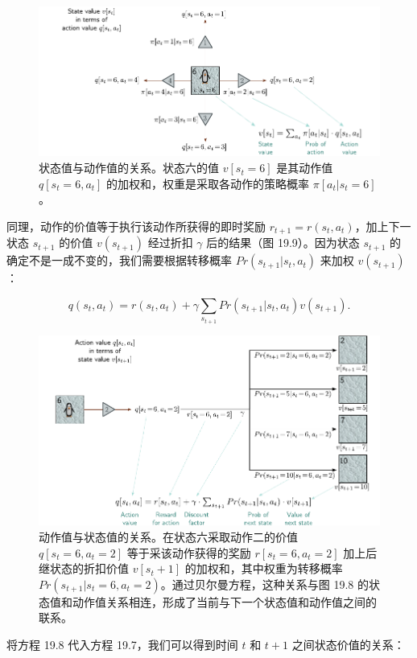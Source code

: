 \documentclass[lang=cn,newtx,10pt,scheme=chinese]{elegantbook}
\begin{document}
\begin{figure}[ht!]
\centering
\includegraphics[width=0.7\linewidth]{PDFFigures/UDLChap19PDF/ReinforceBellman3.pdf}
\caption{状态值与动作值的关系。状态六的值 \(v[s_t =6]\) 是其动作值 \(q[s_t =6,a_t]\) 的加权和，权重是采取各动作的策略概率 \(\pi[a_t|s_t =6]\)。}
\end{figure}

同理，动作的价值等于执行该动作所获得的即时奖励 \(r_{t+1} = r(s_t, a_t)\)，加上下一状态 \(s_{t+1}\) 的价值 \(v(s_{t+1})\) 经过折扣 \(\gamma\) 后的结果（图 19.9）。因为状态 \(s_{t+1}\) 的确定不是一成不变的，我们需要根据转移概率 \(Pr(s_{t+1}|s_t, a_t)\) 来加权 \(v(s_{t+1})\)：

\begin{equation}
q(s_t, a_t) = r(s_t, a_t) + \gamma \sum_{s_{t+1}} Pr(s_{t+1}|s_t, a_t)v(s_{t+1}). 
\end{equation}

\begin{figure}[ht!]
\centering
\includegraphics[width=0.7\linewidth]{PDFFigures/UDLChap19PDF/ReinforceBellman2.pdf}
\caption{动作值与状态值的关系。在状态六采取动作二的价值 \(q[s_t = 6, a_t = 2]\) 等于采该动作获得的奖励 \(r[s_t = 6, a_t = 2]\) 加上后继状态的折扣价值 \(v[s_t+1]\) 的加权和，其中权重为转移概率 \(Pr(s_{t+1}|s_t = 6, a_t = 2)\)。通过贝尔曼方程，这种关系与图 19.8 的状态值和动作值关系相连，形成了当前与下一个状态值和动作值之间的联系。}
\end{figure}

将方程 19.8 代入方程 19.7，我们可以得到时间 \(t\) 和 \(t + 1\) 之间状态价值的关系：
\end{document}
